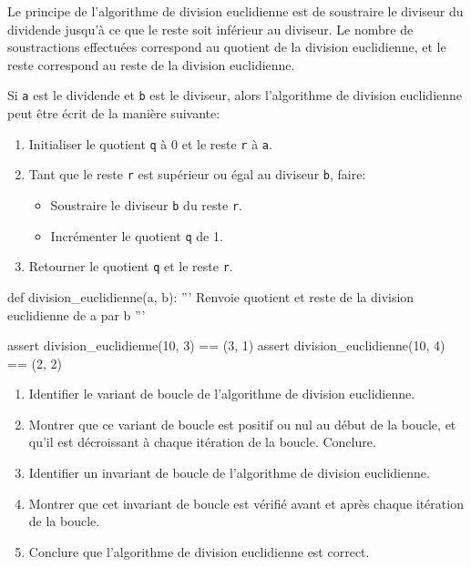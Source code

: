 \pagebreak

\begin{exercice_cours}{}

	Le principe de l'algorithme de division euclidienne est de soustraire le diviseur du dividende jusqu'à ce que le reste soit inférieur au diviseur. Le nombre de soustractions effectuées correspond au quotient de la division euclidienne, et le reste correspond au reste de la division euclidienne.

	Si \texttt{a} est le dividende et \texttt{b} est le diviseur, alors l'algorithme de division euclidienne peut être écrit de la manière suivante:
	\begin{enumerate}
		\item Initialiser le quotient \texttt{q} à 0 et le reste \texttt{r} à \texttt{a}.
		\item Tant que le reste \texttt{r} est supérieur ou égal au diviseur \texttt{b}, faire:
		\begin{itemize}
			\item Soustraire le diviseur \texttt{b} du reste \texttt{r}.
			\item Incrémenter le quotient \texttt{q} de 1.
		\end{itemize}
		\item Retourner le quotient \texttt{q} et le reste \texttt{r}.
	\end{enumerate}

	\begin{CodePythontexAlt}[TaillePolice=\normalsize, Largeur=1\linewidth,Centre,PremLigne=1, Lignes=false]{}
		def division_euclidienne(a, b):
			''' Renvoie quotient et reste de la division euclidienne de a par b '''
			






			



		assert division_euclidienne(10, 3) == (3, 1)	
		assert division_euclidienne(10, 4) == (2, 2)
		\end{CodePythontexAlt}
		\begin{enumerate}
			\item Identifier le variant de boucle de l'algorithme de division euclidienne.
			\item Montrer que ce variant de boucle est positif ou nul au début de la boucle, et qu'il est décroissant à chaque itération de la boucle. Conclure.
			\item Identifier un invariant de boucle de l'algorithme de division euclidienne.
			\item Montrer que cet invariant de boucle est vérifié avant et après chaque itération de la boucle.
			\item Conclure que l'algorithme de division euclidienne est correct.
		\end{enumerate}
\end{exercice_cours}


